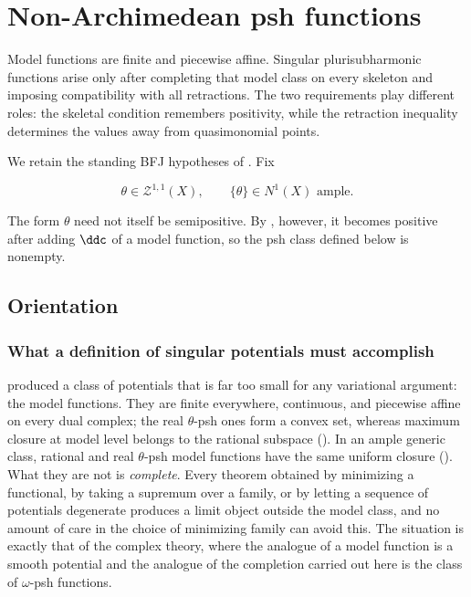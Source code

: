 \chapter{Non-Archimedean psh functions}
\label{chap:bfj-psh}

Model functions are finite and piecewise affine.  Singular
plurisubharmonic functions arise only after completing that model class on
every skeleton and imposing compatibility with all retractions.  The two
requirements play different roles: the skeletal condition remembers
positivity, while the retraction inequality determines the values away from
quasimonomial points.

We retain the standing BFJ hypotheses of
.  Fix

\begin{equation}
\label{eq:ch21-standing-theta}
            \theta\in\mathcal Z^{1,1}(X),
            \qquad \{\theta\}\in N^1(X)\text{ ample}.
\end{equation}

The form \(\theta\) need not itself be semipositive.  By
, however, it becomes positive after
adding \(\ddc\) of a model function, so the psh class defined below is
nonempty.

\section{Orientation}
\label{sec:ch21-orientation}

\subsection{What a definition of singular potentials must accomplish}
\label{sec:ch21-what-must-be-done}

 produced a class of potentials that is far too
small for any variational argument: the model functions.  They are finite
everywhere, continuous, and piecewise affine on every dual complex; the
real \(\theta\)-psh ones form a convex set, whereas maximum closure at
model level belongs to the rational subspace
().  In an ample generic class, rational and
real \(\theta\)-psh model functions have the same uniform closure
().  What they are not is \emph{complete}.  Every
theorem obtained by minimizing a functional, by taking a supremum over a
family, or by letting a sequence of potentials degenerate produces a limit
object outside the model class, and no amount of care in the choice of
minimizing family can avoid this.  The situation is exactly that of the
complex theory, where the analogue of a model function is a smooth
potential and the analogue of the completion carried out here is the class
of \(\omega\)-psh functions.

